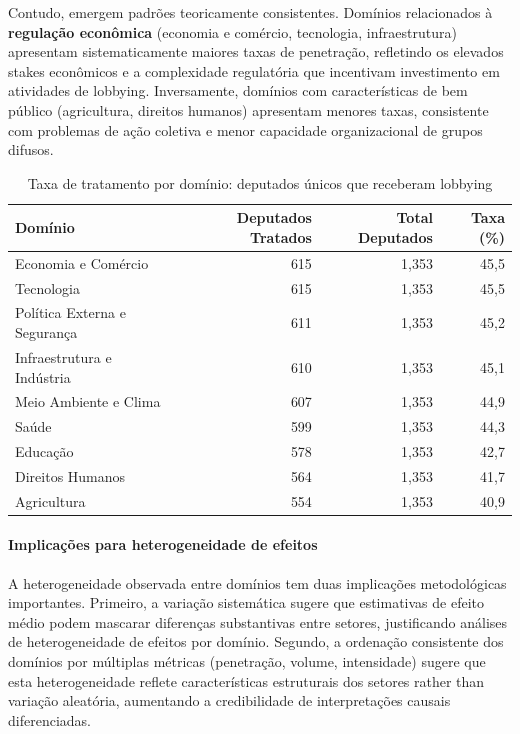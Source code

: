 Contudo, emergem padrões teoricamente consistentes. Domínios relacionados à \textbf{regulação econômica} (economia e comércio, tecnologia, infraestrutura) apresentam sistematicamente maiores taxas de penetração, refletindo os elevados stakes econômicos e a complexidade regulatória que incentivam investimento em atividades de lobbying. Inversamente, domínios com características de bem público (agricultura, direitos humanos) apresentam menores taxas, consistente com problemas de ação coletiva e menor capacidade organizacional de grupos difusos.

\begin{table}[htbp]
\centering
\caption{Taxa de tratamento por domínio: deputados únicos que receberam lobbying}
\label{tab:domain_treatment_rates}
\begin{tabular}{lrrr}
\toprule
\textbf{Domínio} & \textbf{Deputados Tratados} & \textbf{Total Deputados} & \textbf{Taxa (\%)} \\
\midrule
Economia e Comércio & 615 & 1{,}353 & 45{,}5 \\
Tecnologia & 615 & 1{,}353 & 45{,}5 \\
Política Externa e Segurança & 611 & 1{,}353 & 45{,}2 \\
Infraestrutura e Indústria & 610 & 1{,}353 & 45{,}1 \\
Meio Ambiente e Clima & 607 & 1{,}353 & 44{,}9 \\
Saúde & 599 & 1{,}353 & 44{,}3 \\
Educação & 578 & 1{,}353 & 42{,}7 \\
Direitos Humanos & 564 & 1{,}353 & 41{,}7 \\
Agricultura & 554 & 1{,}353 & 40{,}9 \\
\bottomrule
\end{tabular}
\end{table}

\paragraph{Implicações para heterogeneidade de efeitos}

A heterogeneidade observada entre domínios tem duas implicações metodológicas importantes. Primeiro, a variação sistemática sugere que estimativas de efeito médio podem mascarar diferenças substantivas entre setores, justificando análises de heterogeneidade de efeitos por domínio. Segundo, a ordenação consistente dos domínios por múltiplas métricas (penetração, volume, intensidade) sugere que esta heterogeneidade reflete características estruturais dos setores rather than variação aleatória, aumentando a credibilidade de interpretações causais diferenciadas.

